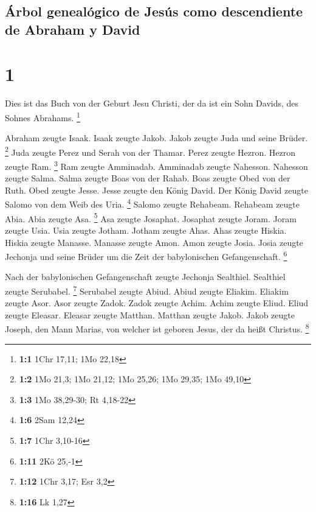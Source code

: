 \hypertarget{uxe1rbol-genealuxf3gico-de-jesuxfas-como-descendiente-de-abraham-y-david}{%
\subsection{Árbol genealógico de Jesús como descendiente de Abraham y
David}\label{uxe1rbol-genealuxf3gico-de-jesuxfas-como-descendiente-de-abraham-y-david}}

\hypertarget{section}{%
\section{1}\label{section}}

 Dies ist das Buch von der Geburt Jesu Christi, der da ist
ein Sohn Davids, des Sohnes Abrahams. \footnote{\textbf{1:1} 1Chr 17,11;
  1Mo 22,18}

 Abraham zeugte Isaak. Isaak zeugte Jakob. Jakob zeugte
Juda und seine Brüder. \footnote{\textbf{1:2} 1Mo 21,3; 1Mo 21,12; 1Mo
  25,26; 1Mo 29,35; 1Mo 49,10}  Juda zeugte Perez und
Serah von der Thamar. Perez zeugte Hezron. Hezron zeugte Ram.
\footnote{\textbf{1:3} 1Mo 38,29-30; Rt 4,18-22}  Ram
zeugte Amminadab. Amminadab zeugte Nahesson. Nahesson zeugte Salma.
 Salma zeugte Boas von der Rahab. Boas zeugte Obed von der
Ruth. Obed zeugte Jesse.  Jesse zeugte den König David.
Der König David zeugte Salomo von dem Weib des Uria. \footnote{\textbf{1:6}
  2Sam 12,24}  Salomo zeugte Rehabeam. Rehabeam zeugte
Abia. Abia zeugte Asa. \footnote{\textbf{1:7} 1Chr 3,10-16}
 Asa zeugte Josaphat. Josaphat zeugte Joram. Joram zeugte
Usia.  Usia zeugte Jotham. Jotham zeugte Ahas. Ahas zeugte
Hiskia.  Hiskia zeugte Manasse. Manasse zeugte Amon. Amon
zeugte Josia.  Josia zeugte Jechonja und seine Brüder um
die Zeit der babylonischen Gefangenschaft. \footnote{\textbf{1:11} 2Kö
  25,-1}

 Nach der babylonischen Gefangenschaft zeugte Jechonja
Sealthiel. Sealthiel zeugte Serubabel. \footnote{\textbf{1:12} 1Chr
  3,17; Esr 3,2}  Serubabel zeugte Abiud. Abiud zeugte
Eliakim. Eliakim zeugte Asor.  Asor zeugte Zadok. Zadok
zeugte Achim. Achim zeugte Eliud.  Eliud zeugte Eleasar.
Eleasar zeugte Matthan. Matthan zeugte Jakob.  Jakob
zeugte Joseph, den Mann Marias, von welcher ist geboren Jesus, der da
heißt Christus. \footnote{\textbf{1:16} Lk 1,27}

